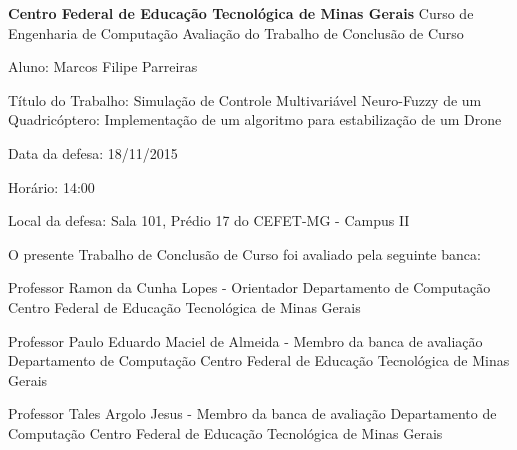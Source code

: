 \begin{center}
\textbf{Centro Federal de Educação Tecnológica de Minas Gerais}
\newline \newline
Curso de Engenharia de Computação
\newline \newline
Avaliação do Trabalho de Conclusão de Curso
\newline
\end{center}
\hfill \break
\noindent Aluno: Marcos Filipe Parreiras

\noindent Título do Trabalho: Simulação de Controle Multivariável Neuro-Fuzzy de um Quadricóptero: Implementação de um algoritmo para estabilização de um Drone

\noindent Data da defesa: 18/11/2015

\noindent Horário: 14:00

\noindent Local da defesa: Sala 101, Prédio 17 do CEFET-MG - Campus II
\hfill \break
\newline
\begin{center}
O  presente Trabalho de Conclusão de Curso foi avaliado pela seguinte banca:\newline \newline

Professor Ramon da Cunha Lopes - Orientador \newline
Departamento de Computação \newline
Centro Federal de Educação Tecnológica de Minas Gerais \newline \newline

Professor Paulo Eduardo Maciel de Almeida - Membro da banca de avaliação \newline
Departamento de Computação \newline
Centro Federal de Educação Tecnológica de Minas Gerais \newline \newline

Professor Tales Argolo Jesus - Membro da banca de avaliação \newline
Departamento de Computação \newline
Centro Federal de Educação Tecnológica de Minas Gerais \newline \newline

\end{center}